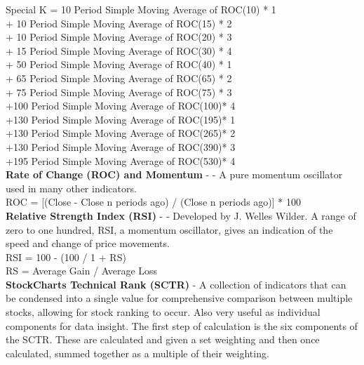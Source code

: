 \documentclass[conference]{IEEEtran}
\begin{document}
\noindent
Special K = 10 Period Simple Moving Average of ROC(10) * 1 \\
            + 10 Period Simple Moving Average of ROC(15) * 2 \\
            + 10 Period Simple Moving Average of ROC(20) * 3 \\
            + 15 Period Simple Moving Average of ROC(30) * 4 \\
            + 50 Period Simple Moving Average of ROC(40) * 1 \\
            + 65 Period Simple Moving Average of ROC(65) * 2 \\
            + 75 Period Simple Moving Average of ROC(75) * 3 \\
            +100 Period Simple Moving Average of ROC(100)* 4 \\
            +130 Period Simple Moving Average of ROC(195)* 1 \\
            +130 Period Simple Moving Average of ROC(265)* 2 \\
            +130 Period Simple Moving Average of ROC(390)* 3 \\
            +195 Period Simple Moving Average of ROC(530)* 4 \\

\iffalse
[]
\fi

\noindent
\textbf{Rate of Change (ROC) and Momentum} - \cite{Murphy1999} - A pure momentum oscillator used in many other indicators.\\

\noindent
ROC = [(Close - Close n periods ago) / (Close n periods ago)] * 100 \\

\iffalse
[]
\fi

\noindent
\textbf{Relative Strength Index (RSI)} - \cite{Wilder1978} - Developed by J. Welles Wilder. A range of zero to one hundred, RSI, a momentum oscillator, gives an indication of the speed and change of price movements.\\

\noindent
RSI = 100 - (100 / 1 + RS) \\
RS = Average Gain / Average Loss\\

\iffalse
[]
\fi

\noindent
\textbf{StockCharts Technical Rank (SCTR)} - A collection of indicators that can be condensed into a single value for comprehensive comparison between multiple stocks, allowing for stock ranking to occur. Also very useful as individual components for data insight. The first step of calculation is the six components of the SCTR. These are calculated and given a set weighting and then once calculated, summed together as a multiple of their weighting. \\
\end{document}

